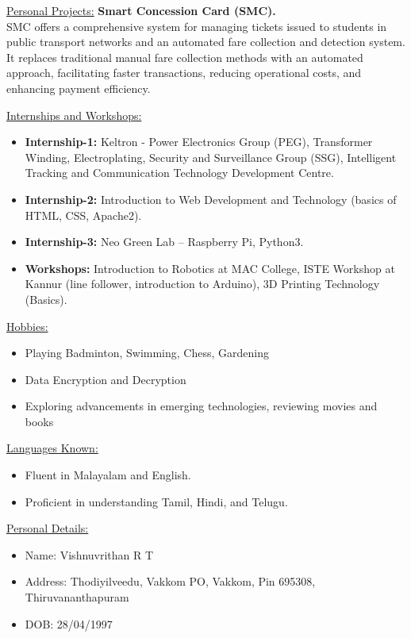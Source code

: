 \documentclass[letterpaper,11pt]{article}
\begin{document}
	\underline{\large Personal Projects:}
	\newline
	\textbf{Smart Concession Card (SMC).}\\
	SMC offers a comprehensive system for managing tickets issued to students in public transport networks and an automated fare collection and detection system. It replaces traditional manual fare collection methods with an automated approach, facilitating faster transactions, reducing operational costs, and enhancing payment efficiency.
	
	\underline{\large Internships and Workshops:}
	\begin{itemize}
		\item \textbf{Internship-1:} Keltron - Power Electronics Group (PEG), Transformer Winding, Electroplating, Security and Surveillance Group (SSG), Intelligent Tracking and Communication Technology Development Centre.\\
		\item \textbf{Internship-2:} Introduction to Web Development and Technology (basics of HTML, CSS, Apache2).\\
		\item \textbf{Internship-3:} Neo Green Lab – Raspberry Pi, Python3.\\
		\item \textbf{Workshops:} Introduction to Robotics at MAC College, ISTE Workshop at Kannur (line follower, introduction to Arduino), 3D Printing Technology (Basics).
	\end{itemize}
	
	\underline{\large Hobbies:}
	\begin{itemize}
		\item Playing Badminton, Swimming, Chess, Gardening
		\item Data Encryption and Decryption
		\item Exploring advancements in emerging technologies, reviewing movies and books
	\end{itemize}
	
	\underline{\large Languages Known:}
	\begin{itemize}
		\item Fluent in Malayalam and English.
		\item Proficient in understanding Tamil, Hindi, and Telugu.
	\end{itemize}
	
	\underline{\large Personal Details:}\\
	\begin{itemize}
		\item Name: Vishnuvrithan R T
		\item Address: Thodiyilveedu, Vakkom PO, Vakkom, Pin 695308, Thiruvananthapuram
		\item DOB: 28/04/1997
	\end{itemize}
	
\end{document}
